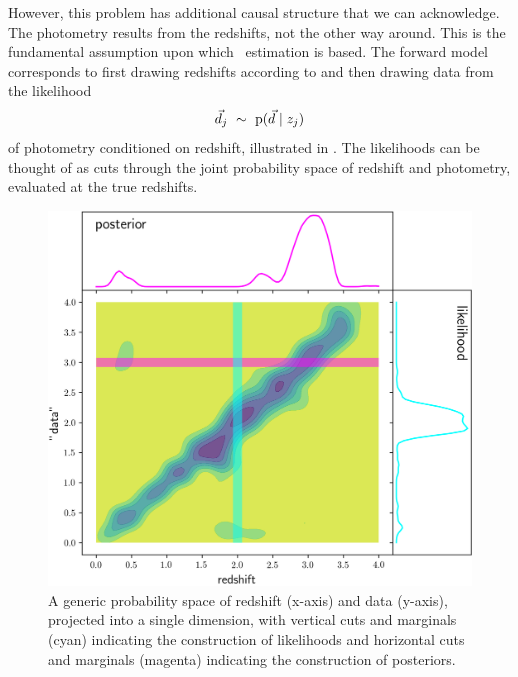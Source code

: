 However, this problem has additional causal structure that we can acknowledge.
The photometry results from the redshifts, not the other way around.
This is the fundamental assumption upon which \pz\ estimation is based.
The forward model corresponds to first drawing redshifts according to  and then drawing data from the likelihood
\begin{equation}
\eqlabel{eqn:pzpdf}
\data_{j}\ \sim\ \pr{\data \gvn z_{j}}
\end{equation}
of photometry conditioned on redshift, illustrated in .
The likelihoods can be thought of as cuts through the joint probability space of redshift and photometry, evaluated at the true redshifts.

\begin{figure}
	\begin{center}
		\includegraphics[width=\textwidth]{figures/chippr/jain05.png}
		\caption{
			A generic probability space of redshift (x-axis) and data (y-axis), projected into a single dimension, with vertical cuts and marginals (cyan) indicating the construction of likelihoods and horizontal cuts and marginals (magenta) indicating the construction of posteriors.
		}
	\end{center}
\end{figure}

